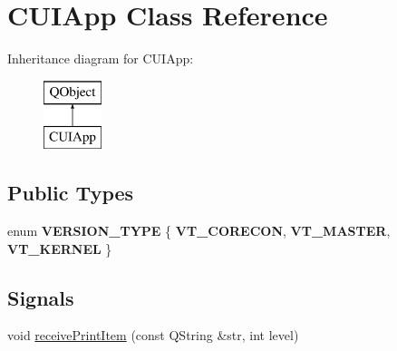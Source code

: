 \hypertarget{classCUIApp}{\section{C\-U\-I\-App Class Reference}
\label{classCUIApp}
}
Inheritance diagram for C\-U\-I\-App\-:\begin{figure}[H]
\begin{center}
\leavevmode
\includegraphics[height=2.000000cm]{classCUIApp}
\end{center}
\end{figure}
\subsection*{Public Types}
\begin{DoxyCompactItemize}
\item 
enum {\bfseries V\-E\-R\-S\-I\-O\-N\-\_\-\-T\-Y\-P\-E} \{ {\bfseries V\-T\-\_\-\-C\-O\-R\-E\-C\-O\-N}, 
{\bfseries V\-T\-\_\-\-M\-A\-S\-T\-E\-R}, 
{\bfseries V\-T\-\_\-\-K\-E\-R\-N\-E\-L}
 \}
\end{DoxyCompactItemize}
\subsection*{Signals}
\begin{DoxyCompactItemize}
\item 
void \hyperlink{classCUIApp_a9324e3388ce7ccfb3ec6b0862d61aa52}{receive\-Print\-Item} (const Q\-String \&str, int level)
\end{DoxyCompactItemize}
